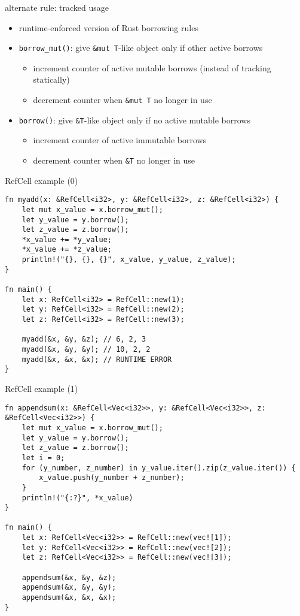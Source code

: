 \begin{frame}[fragile]{alternate rule: tracked usage}
    \begin{itemize}
    \item runtime-enforced version of Rust borrowing rules
    \item \texttt{borrow\_mut()}: give \verb|&mut T|-like object only if other active borrows
        \begin{itemize}
        \item increment counter of active mutable borrows (instead of tracking statically)
        \item decrement counter when \verb|&mut T| no longer in use 
        \end{itemize}
    \item \texttt{borrow()}: give \verb|&T|-like object only if no active mutable borrows
        \begin{itemize}
        \item increment counter of active immutable borrows
        \item decrement counter when \verb|&T| no longer in use
        \end{itemize}
    \end{itemize}
\end{frame}

\begin{frame}[fragile]{RefCell example (0)}
\begin{verbatim}
fn myadd(x: &RefCell<i32>, y: &RefCell<i32>, z: &RefCell<i32>) {
    let mut x_value = x.borrow_mut();
    let y_value = y.borrow();
    let z_value = z.borrow();
    *x_value += *y_value;
    *x_value += *z_value;
    println!("{}, {}, {}", x_value, y_value, z_value);
}

fn main() {
    let x: RefCell<i32> = RefCell::new(1);
    let y: RefCell<i32> = RefCell::new(2);
    let z: RefCell<i32> = RefCell::new(3);
    
    myadd(&x, &y, &z); // 6, 2, 3
    myadd(&x, &y, &y); // 10, 2, 2
    myadd(&x, &x, &x); // RUNTIME ERROR
}
\end{verbatim}
\end{frame}

\begin{frame}[fragile]{RefCell example (1)}
\begin{verbatim}
fn appendsum(x: &RefCell<Vec<i32>>, y: &RefCell<Vec<i32>>, z: &RefCell<Vec<i32>>) {
    let mut x_value = x.borrow_mut();
    let y_value = y.borrow();
    let z_value = z.borrow();
    let i = 0;
    for (y_number, z_number) in y_value.iter().zip(z_value.iter()) {
        x_value.push(y_number + z_number);
    }
    println!("{:?}", *x_value)
}

fn main() {
    let x: RefCell<Vec<i32>> = RefCell::new(vec![1]);
    let y: RefCell<Vec<i32>> = RefCell::new(vec![2]);
    let z: RefCell<Vec<i32>> = RefCell::new(vec![3]);
    
    appendsum(&x, &y, &z);
    appendsum(&x, &y, &y);
    appendsum(&x, &x, &x);
}
\end{verbatim}
\end{frame}

